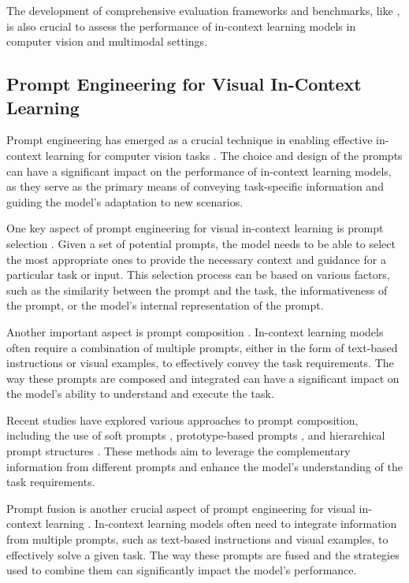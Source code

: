 \documentclass[11pt]{article}
\begin{document}
The development of comprehensive evaluation frameworks and benchmarks, like \cite{ref184}, is also crucial to assess the performance of in-context learning models in computer vision and multimodal settings.

\subsection{Prompt Engineering for Visual In-Context Learning}

Prompt engineering has emerged as a crucial technique in enabling effective in-context learning for computer vision tasks \cite{ref24}. The choice and design of the prompts can have a significant impact on the performance of in-context learning models, as they serve as the primary means of conveying task-specific information and guiding the model's adaptation to new scenarios.

One key aspect of prompt engineering for visual in-context learning is prompt selection \cite{ref233}. Given a set of potential prompts, the model needs to be able to select the most appropriate ones to provide the necessary context and guidance for a particular task or input. This selection process can be based on various factors, such as the similarity between the prompt and the task, the informativeness of the prompt, or the model's internal representation of the prompt.

Another important aspect is prompt composition \cite{ref233}. In-context learning models often require a combination of multiple prompts, either in the form of text-based instructions or visual examples, to effectively convey the task requirements. The way these prompts are composed and integrated can have a significant impact on the model's ability to understand and execute the task.

Recent studies have explored various approaches to prompt composition, including the use of soft prompts \cite{ref234}, prototype-based prompts \cite{ref235}, and hierarchical prompt structures \cite{ref236}. These methods aim to leverage the complementary information from different prompts and enhance the model's understanding of the task requirements.

Prompt fusion is another crucial aspect of prompt engineering for visual in-context learning \cite{ref148}. In-context learning models often need to integrate information from multiple prompts, such as text-based instructions and visual examples, to effectively solve a given task. The way these prompts are fused and the strategies used to combine them can significantly impact the model's performance.
\end{document}
